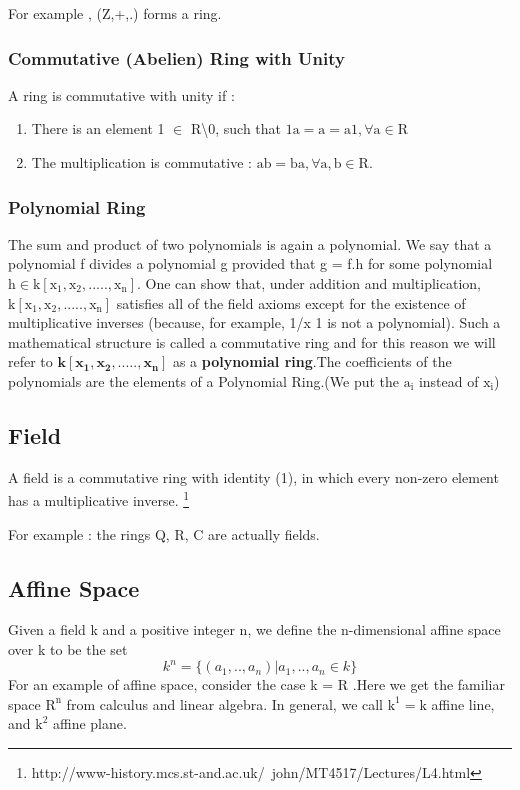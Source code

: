\documentclass[11pt]{article}
\begin{document}
For example , (Z,+,.) forms a ring.

\subsubsection{Commutative (Abelien) Ring with Unity}
A ring is commutative with unity if :
\begin{enumerate}
\item There is an element 1 $\mathrm{\in}$  R\textbackslash0, such that $\mathrm{ 1a=a=a1 , \forall a \in R}$
\item The multiplication is commutative : $\mathrm{ ab=ba , \forall a,b \in R}$.
\end{enumerate}

\subsubsection{Polynomial Ring}
The sum and product of two polynomials is again a polynomial. We say that a
polynomial f divides a polynomial g provided that g = f.h for some polynomial
$\mathrm{ h \in k[x_{1},x_2,.....,x_n]}$.\newline
One can show that, under addition and multiplication, $\mathrm{k[x_{1},x_2,.....,x_n]}$ satisfies all of the field axioms except for the existence of multiplicative inverses (because, for example, 1/x 1 is not a polynomial). \newline
Such a mathematical structure is called a commutative ring and for this reason we will
refer to $\mathbf{k[x_{1},x_2,.....,x_n]}$ as a \textbf{polynomial ring}.The coefficients of the polynomials are the elements of a Polynomial Ring.(We put the $\mathrm{a_i}$ instead of $\mathrm{x_i}$)  



\subsection{Field}
A field is a commutative ring with identity (1), in which every non-zero element has a multiplicative inverse. \footnote{http://www-history.mcs.st-and.ac.uk/~john/MT4517/Lectures/L4.html}

For example : the rings Q, R, C are actually fields.

\subsection{Affine Space}
Given a field k and a positive integer n, we define the n-dimensional
affine space over k to be the set
\begin{equation}
 k^n =\{(a_1,..,a_n)| a_1, .. ,a_n \in k \}
\end{equation}     
For an example of affine space, consider the case k = $\mathrm{R}$ .Here we get the familiar space $\mathrm{R^n}$ from calculus and linear algebra. In general, we call
$\mathrm{k^1=k}$ affine line, and $\mathrm{k^2}$ affine plane.\newline
\end{document}
